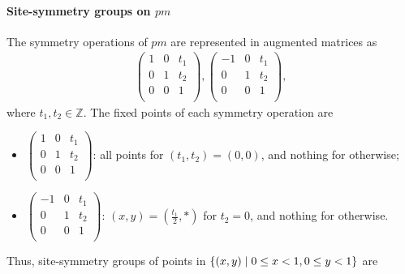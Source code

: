 \paragraph{Site-symmetry groups on $pm$}

The symmetry operations of $pm$ are represented in augmented matrices as
\begin{align*}
  \left(
    \begin{array}{cc|c}
        1 & 0 & t_{1} \\
        0 & 1 & t_{2} \\
        \hline
        0 & 0 & 1 \\
    \end{array}
  \right),
  \left(
    \begin{array}{cc|c}
        -1 & 0 & t_{1} \\
        0  & 1 & t_{2} \\
        \hline
        0 & 0 & 1 \\
    \end{array}
  \right),
\end{align*}
where $t_{1}, t_{2} \in \mathbb{Z}$.
The fixed points of each symmetry operation are
\begin{itemize}
  \item $\left(
    \begin{array}{cc|c}
        1 & 0 & t_{1} \\
        0 & 1 & t_{2} \\
        \hline
        0 & 0 & 1 \\
    \end{array}
  \right)$: all points for $(t_{1}, t_{2}) = (0, 0)$, and nothing for otherwise;
  \item $\left(
    \begin{array}{cc|c}
        -1 & 0 & t_{1} \\
        0  & 1 & t_{2} \\
        \hline
        0 & 0 & 1 \\
    \end{array}
  \right)$: $(x, y) = (\frac{t_{1}}{2}, \ast)$ for $t_{2} = 0$, and nothing for otherwise.
\end{itemize}
Thus, site-symmetry groups of points in $\left\{ (x, y) \mathrel{}\middle|\mathrel{}  0 \leq x < 1, 0 \leq y < 1 \right\}$ are
